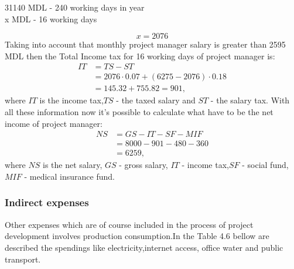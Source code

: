 \begin{center}
	31140 MDL - 240 working days in year\\
	x MDL     - 16 working days\\
\end{center}
\begin{equation}
x = 2076
\end{equation}
Taking into account that monthly project manager salary is greater than 2595 MDL then the Total Income tax for 16 working days of project manager is:
\begin{equation}
\begin{split}
IT &= TS - ST \\
&= 2076 \cdot 0.07 + (6275 - 2076) \cdot 0.18 \\
& = 145.32 + 755.82 = 901,
\end{split}
\end{equation}
where $IT$ is the income tax,$TS$ - the taxed salary and $ST$ - the salary tax.
With all these information now it's possible to calculate what have to be the net income of project manager:
\begin{equation}
\begin{split}
NS &= GS - IT - SF - MIF \\
&= 8000 - 901 - 480 - 360 \\
&= 6259,
\end{split}
\end{equation}
where $NS$ is the net salary, $GS$ - gross salary, $IT$ - income tax,$SF$ - social fund, $MIF$ - medical insurance fund.
\subsubsection{Indirect expenses}
Other expenses which are of course included in the process of project development involves production consumption.In the Table 4.6 bellow are described the spendings like electricity,internet access, office water and public transport.
\begin{table}[H]
	\centering
	\caption{Indirect expenses}
	\label{my-label}
\end{table}
